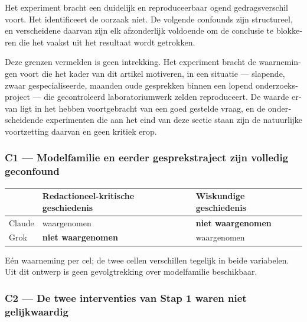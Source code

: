 \begin{dutch}
Het experiment bracht een duidelijk en reproduceerbaar ogend gedragsverschil voort. Het identificeert de oorzaak niet. De volgende confounds zijn structureel, en verscheidene daarvan zijn elk afzonderlijk voldoende om de conclusie te blokkeren die het vaakst uit het resultaat wordt getrokken.

Deze grenzen vermelden is geen intrekking. Het experiment bracht de waarnemingen voort die het kader van dit artikel motiveren, in een situatie — slapende, zwaar gespecialiseerde, maanden oude gesprekken binnen een lopend onderzoeksproject — die gecontroleerd laboratoriumwerk zelden reproduceert. De waarde ervan ligt in het hebben voortgebracht van een goed gestelde vraag, en de onderscheidende experimenten die aan het eind van deze sectie staan zijn de natuurlijke voortzetting daarvan en geen kritiek erop.


\subsubsection*{C1 — Modelfamilie en eerder gesprekstraject zijn volledig geconfound}
\label{sec:nl:x-c1-modelfamilie-en-eerder-gesprekstrajec}

\begin{center}
\small
\begin{tabularx}{\linewidth}{>{\raggedright\arraybackslash}X>{\raggedright\arraybackslash}X>{\raggedright\arraybackslash}X}
\toprule
 & \textbf{Redactioneel-kritische geschiedenis} & \textbf{Wiskundige geschiedenis} \\
\midrule
Claude & waargenomen & \textbf{niet waargenomen} \\
Grok & \textbf{niet waargenomen} & waargenomen \\
\bottomrule
\end{tabularx}
\end{center}
Eén waarneming per cel; de twee cellen verschillen tegelijk in beide variabelen. Uit dit ontwerp is geen gevolgtrekking over modelfamilie beschikbaar.


\subsubsection*{C2 — De twee interventies van Stap 1 waren niet gelijkwaardig}
\label{sec:nl:x-c2-de-twee-interventies-van-stap-1-waren}


\end{dutch}
